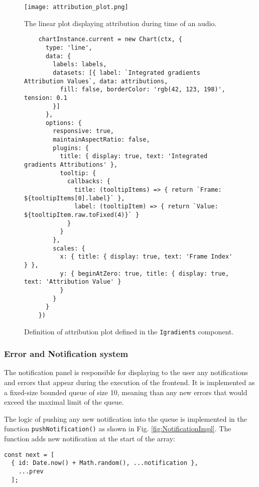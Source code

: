 \documentclass[
    bindingoffset=5mm,  %
    footnoteindent=3mm, %
    hyphenation=true    %
]{src/wut-thesis}
\begin{document}
\begin{figure}[h!] %
    \centering
    \texttt{[image: attribution\_plot.png]}
    \caption{The linear plot displaying attribution during time of an audio.}
    \label{fig:AttrPlot}
\end{figure}

\begin{figure}%
\begin{verbatim}
    chartInstance.current = new Chart(ctx, {
      type: 'line',
      data: {
        labels: labels,
        datasets: [{ label: `Integrated gradients Attribution Values`, data: attributions,
          fill: false, borderColor: 'rgb(42, 123, 198)', tension: 0.1
        }]
      },
      options: {
        responsive: true,
        maintainAspectRatio: false,
        plugins: {
          title: { display: true, text: 'Integrated gradients Attributions' },
          tooltip: {
            callbacks: {
              title: (tooltipItems) => { return `Frame: ${tooltipItems[0].label}` },
              label: (tooltipItem) => { return `Value: ${tooltipItem.raw.toFixed(4)}` }
            }
          }
        },
        scales: {
          x: { title: { display: true, text: 'Frame Index' } },
          y: { beginAtZero: true, title: { display: true, text: 'Attribution Value' }
          }
        }
      }
    })
\end{verbatim}
\caption{Definition of attribution plot defined in the \texttt{Igradients} component.}
\label{fig:IgradientsAttrPlot}
\end{figure}

\subsubsection{Error and Notification system}

The notification panel is responsible for displaying to the user any notifications
and errors that appear during the execution of the frontend. It is implemented as
a fixed-size bounded queue of size 10, meaning than any new errors that would exceed
the maximal limit of the queue.

The logic of pushing any new notification into the queue is implemented in the function
\texttt{pushNotification()} as shown in Fig. \ref{fig:NotificationImpl}.
The function adds new notification at the start of the array:

\begin{verbatim}
const next = [
  { id: Date.now() + Math.random(), ...notification },
    ...prev
  ];
\end{verbatim}
\end{document}
